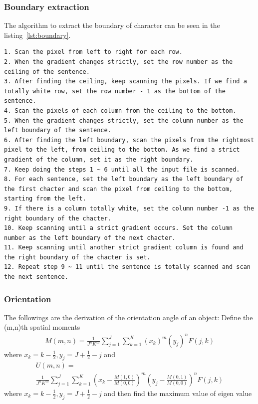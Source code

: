 \documentclass{article}
\begin{document}
\subsubsection{Boundary extraction}
The algorithm to extract the boundary of character can be seen in the listing~\ref{lst:boundary}.
\begin{lstlisting}[caption={Boundary Extraction algorithm},label={lst:boundary}]
1. Scan the pixel from left to right for each row.
2. When the gradient changes strictly, set the row number as the ceiling of the sentence.
3. After finding the ceiling, keep scanning the pixels. If we find a totally white row, set the row number - 1 as the bottom of the sentence.
4. Scan the pixels of each column from the ceiling to the bottom.
5. When the gradient changes strictly, set the column number as the left boundary of the sentence.
6. After finding the left boundary, scan the pixels from the rightmost pixel to the left, from ceiling to the bottom. As we find a strict gradient of the column, set it as the right boundary.
7. Keep doing the steps 1 ~ 6 until all the input file is scanned.
8. For each sentence, set the left boundary as the left boundary of the first chacter and scan the pixel from ceiling to the bottom, starting from the left.
9. If there is a column totally white, set the column number -1 as the right boundary of the chacter.
10. Keep scanning until a strict gradient occurs. Set the column number as the left boundary of the next chacter.
11. Keep scanning until another strict gradient column is found and the right boundary of the chacter is set.
12. Repeat step 9 ~ 11 until the sentence is totally scanned and scan the next sentence.
\end{lstlisting}

\subsubsection{Orientation}

The followings are the derivation of the orientation angle of an object:
Define the (m,n)th spatial moments
\begin{multline}
M(m,n)=\frac{1}{J^n K^m}\sum_{j=1}^J\sum_{k=1}^K (x_k)^m (y_j)^n F(j,k)
\end{multline}
where $x_k=k-\frac{1}{2}, y_j=J+\frac{1}{2}-j$ and
\begin{multline}
U(m,n)= \\ \frac{1}{J^n K^m}\sum_{j=1}^J\sum_{k=1}^K \left(x_k-\frac{M(1,0)}{M(0,0)}\right)^m  \left(y_j-\frac{M(0,1)}{M(0,0)}\right)^n F(j,k)
\end{multline}
where $x_k=k-\frac{1}{2}, y_j=J+\frac{1}{2}-j$ and then find the maximum value of eigen value
\end{document}
